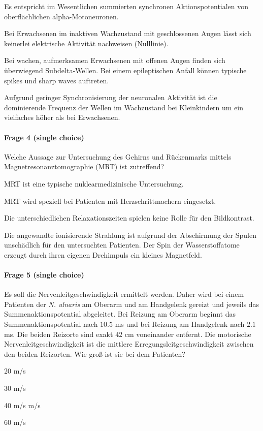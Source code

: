 \begin{benumerate}
  \item Es entspricht im Wesentlichen summierten synchronen Aktionspotentialen von oberflächlichen alpha-Motoneuronen.
  \item Bei Erwachsenen im inaktiven Wachzustand mit geschlossenen Augen lässt sich keinerlei elektrische Aktivität nachweisen (Nulllinie).
  \item Bei wachen, aufmerksamen Erwachsenen mit offenen Augen finden sich überwiegend Subdelta-Wellen.
  \bolditem Bei einem epileptischen Anfall können typische spikes und sharp waves auftreten.
  \item Aufgrund geringer Synchronisierung der neuronalen Aktivität ist die dominierende Frequenz der Wellen im Wachzustand bei Kleinkindern um ein vielfaches höher als bei Erwachsenen.
\end{benumerate}

\paragraph{Frage 4 (single choice)}

Welche Aussage zur Untersuchung des Gehirns und Rückenmarks mittels Magnetresonanztomographie (MRT) ist zutreffend?
\begin{benumerate}
  \item MRT ist eine typische nuklearmedizinische Untersuchung.
  \item MRT wird speziell bei Patienten mit Herzschrittmachern eingesetzt.
  \item Die unterschiedlichen Relaxationszeiten spielen keine Rolle für den Bildkontrast.
  \item Die angewandte ionisierende Strahlung ist aufgrund der Abschirmung der Spulen unschädlich für den untersuchten Patienten.
  \bolditem Der Spin der Wasserstoffatome erzeugt durch ihren eigenen Drehimpuls ein kleines Magnetfeld.
\end{benumerate}

\paragraph{Frage 5 (single choice)}

Es soll die Nervenleitgeschwindigkeit ermittelt werden. Daher wird bei einem Patienten der \emph{N. ulnaris} am Oberarm und am Handgelenk gereizt und jeweils das Summenaktionspotential abgeleitet. Bei Reizung am Oberarm beginnt das Summenaktionspotential nach \( 10.5 \) ms und bei Reizung am Handgelenk nach \( 2.1 \) ms. Die beiden Reizorte sind exakt \( 42 \) cm voneinander entfernt. Die motorische Nervenleitgeschwindigkeit ist die mittlere Erregungsleitgeschwindigkeit zwischen den beiden Reizorten. Wie groß ist sie bei dem Patienten?
\begin{benumerate}
  \item 20 m/s
  \item 30 m/s
  \item 40 m/s
   m/s
  \item 60 m/s
\end{benumerate}

